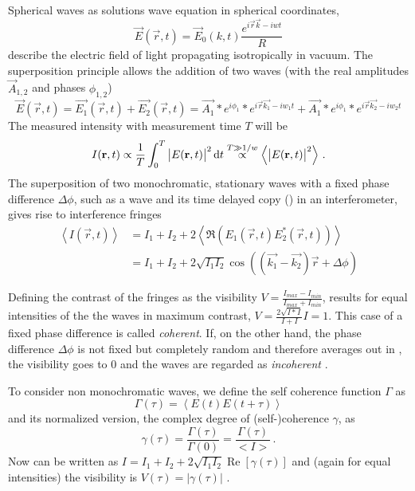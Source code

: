 Spherical waves as solutions wave equation in spherical coordinates,
\begin{equation}
	\vec{E}(\vec{r},t)=\vec{E}_0(k,t) \frac{e^{i\vec{r}\vec{k}-iwt}}{R}
\end{equation}
describe the electric field of light propagating isotropically in vacuum. 
The superposition principle allows the addition of two waves (with the real amplitudes $\vec{A}_{1,2}$ and phases $\phi_{1,2}$)
\begin{equation}
\vec{E}(\vec{r},t)=\vec{E_1}(\vec{r},t)+\vec{E_2}(\vec{r},t)=\vec{A_1}*e^{i\phi_1} * e^{i\vec{r}\vec{k_1}-iw_1t} + \vec{A_1}*e^{i\phi_1} * e^{i\vec{r}\vec{k_2}-iw_2t} 
\end{equation} 
The measured intensity with measurement time $T$ will be
\begin{equation}
	I(\mathbf{r},t)\propto \frac{1}{T} \int_0^T \left|E(\mathbf{r},t)\right|^2 \operatorname{\mathrm{d}\!} t
	\stackrel{T\gg1/w}{\propto}
    \left<\left|E(\mathbf{r},t)\right|^2\right> \,.
\end{equation}
The superposition of two monochromatic, stationary waves with a fixed phase difference $\Delta \phi$, such as a wave and its time delayed copy () in an interferometer, gives rise to interference fringes
\begin{align}
	\left<I(\vec{r},t)\right> & = I_1+I_2+2\left<\Re({E_1(\vec{r},t)}E_2^*(\vec{r},t))\right> \\
	& = I_1+I_2+2\sqrt{I_1I_2}\cos\left((\vec{k_1}-\vec{k_2})\vec{r}+\Delta \phi\right) 
\label{eq:interference}
\end{align}

Defining the contrast of the fringes as the visibility $V=\frac{I_{max}-I_{min}}{I_{max}+I_{min}}$,
results for equal intensities of the the waves in maximum contrast,  $V=\frac{2\sqrt{I*I}}{I+I}I=1$. This case of a fixed phase difference is called \textit{coherent}.
If, on the other hand, the phase difference $\Delta \phi$ is not fixed but completely random and therefore averages out in , the visibility goes to 0 and the waves are regarded as \textit{incoherent}  \cite{born1980,goodman2000}.

To consider non monochromatic waves, we define the self coherence function $\Gamma$ as 
\begin{equation}
\Gamma(\tau)=\left< E(t)E(t+\tau)\right>
\end{equation}
and its normalized version, the complex degree of (self-)coherence $\gamma$, as
\begin{equation}
\gamma(\tau)=\frac{\Gamma(\tau)}{\Gamma(0)} =  \frac{\Gamma(\tau)}{<I>} \,.
\end{equation} 
Now  can be written as $I=I_{1}+I_{2}+2 \sqrt{I_{1} I_{2}} \operatorname{Re}\left[\gamma(\tau)\right]$ and (again for equal intensities) the visibility is $V(\tau)=\left|\gamma(\tau)\right|$ \cite{zernike1938,loudon2000}.

